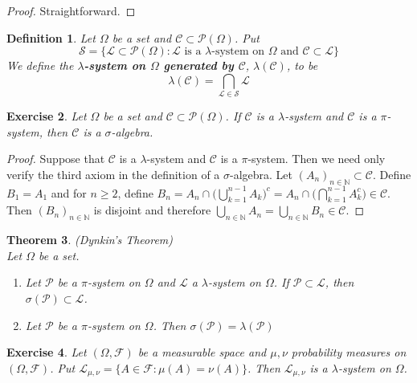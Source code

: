 \documentclass[12pt]{amsart}
\newtheorem{thm}{Theorem}[section]
\newtheorem{defn}[thm]{Definition}
\newtheorem{ex}[thm]{Exercise}
\newcommand{\lam}{\lambda}
\newcommand{\sig}{\sigma}
\newcommand{\Om}{\Omega}
\newcommand{\N}{\mathbb{N}}
\newcommand{\MC}{\mathcal{C}}
\newcommand{\MF}{\mathcal{F}}
\newcommand{\ML}{\mathcal{L}}
\newcommand{\MS}{\mathcal{S}}
\newcommand{\MP}{\mathcal{P}}
\begin{document}
\begin{proof}
Straightforward.
\end{proof}

\begin{defn}
Let $\Om$ be a set and $\MC \subset \MP(\Om)$. Put $$\MS = \{\ML \subset \MP(\Om): \ML \text{ is a }\lam\text{-system on }\Om \text{ and } \MC \subset \ML\}$$ We define the \textbf{$\lam$-system on $\Om$ generated by $\MC$}, $\lam(\MC)$, to be $$\lam(\MC) = \bigcap_{\ML \in \MS}\ML$$
\end{defn}

\begin{ex}
Let $\Om$ be a set and $\MC \subset \MP(\Om)$. If $\MC$ is a $\lam$-system and $\MC$ is a $\pi$-system, then $\MC$ is a $\sig$-algebra.
\end{ex}

\begin{proof}
Suppose that $\MC$ is a $\lam$-system and $\MC$ is a $\pi$-system. Then we need only verify the third axiom in the definition of a $\sig$-algebra. Let $(A_n)_{n \in \N} \subset \MC$. Define $B_1 = A_1$ and for $n \geq 2$, define $B_n = A_n \cap \bigg( \bigcup\limits_{k=1}^{n-1}A_k \bigg)^c = A_n \cap \bigg( \bigcap\limits_{k=1}^{n-1}A_k^c \bigg) \in \MC$. Then $(B_n)_{n \in \N}$ is disjoint and therefore $\bigcup\limits_{n \in \N}A_n = \bigcup\limits_{n \in \N}B_n \in \MC$.
\end{proof}

\begin{thm}(Dynkin's Theorem) \\
Let $\Om$ be a set.
\begin{enumerate}
\item Let $\MP$ be a $\pi$-system on $\Om$ and $\ML$ a $\lam$-system on $\Om$. If $\MP \subset \ML$, then $\sig(\MP) \subset \ML$.
\item Let $\MP$ be a $\pi$-system on $\Om$. Then $\sig(\MP) = \lam(\MP)$
\end{enumerate} 

\end{thm}

\begin{ex}
Let $(\Om, \MF)$ be a measurable space and $\mu, \nu$ probability measures on $(\Om, \MF)$. Put $\ML_{\mu,\nu} = \{A \in \MF: \mu(A) = \nu(A)\}$. Then $\ML_{\mu, \nu}$ is a $\lam$-system on $\Om$.
\end{ex}
\end{document}
